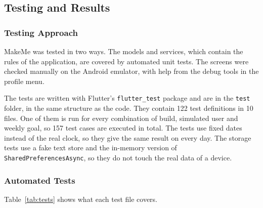 \documentclass[11pt]{article}
\begin{document}
\subsection{Testing and Results}
\label{sec:testing}

\subsubsection*{Testing Approach}

MakeMe was tested in two ways. The models and services, which contain the rules of the application, are covered by automated unit tests. The screens were checked manually on the Android emulator, with help from the debug tools in the profile menu.

The tests are written with Flutter's \texttt{flutter\_test} package and are in the \texttt{test} folder, in the same structure as the code. They contain 122 test definitions in 10 files. One of them is run for every combination of build, simulated user and weekly goal, so 157 test cases are executed in total. The tests use fixed dates instead of the real clock, so they give the same result on every day. The storage tests use a fake text store and the in-memory version of \texttt{SharedPreferencesAsync}, so they do not touch the real data of a device.


\subsubsection*{Automated Tests}

Table~\ref{tab:tests} shows what each test file covers.
\end{document}
